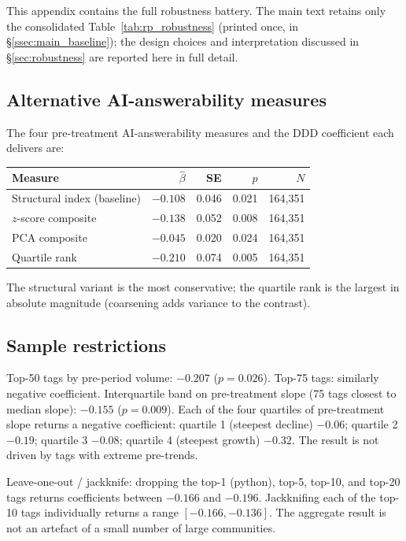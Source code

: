 This appendix contains the full robustness battery. The
main text retains only the consolidated
Table~\ref{tab:rp_robustness} (printed once, in
\S\ref{ssec:main_baseline}); the design choices and
interpretation discussed in
\S\ref{sec:robustness} are reported here in full detail.

\subsection{Alternative AI-answerability
measures}\label{app:rob_ai_measures}

The four pre-treatment AI-answerability measures and the
DDD coefficient each delivers are:

\begin{center}
\small
\begin{tabular}{lrrrr}
\toprule
Measure & $\hat\beta$ & SE & $p$ & $N$ \\
\midrule
Structural index (baseline) & $-0.108$ & 0.046 & 0.021 &
164{,}351 \\
$z$-score composite          & $-0.138$ & 0.052 & 0.008 &
164{,}351 \\
PCA composite                & $-0.045$ & 0.020 & 0.024 &
164{,}351 \\
Quartile rank                & $-0.210$ & 0.074 & 0.005 &
164{,}351 \\
\bottomrule
\end{tabular}
\end{center}

The structural variant is the most conservative; the
quartile rank is the largest in absolute magnitude
(coarsening adds variance to the contrast).

\subsection{Sample restrictions}\label{app:rob_samples}

Top-50 tags by pre-period volume: $-0.207$ ($p=0.026$).
Top-75 tags: similarly negative coefficient. Interquartile
band on pre-treatment slope (75 tags closest to median
slope): $-0.155$ ($p=0.009$). Each of the four quartiles of
pre-treatment slope returns a negative coefficient:
quartile 1 (steepest decline) $-0.06$;
quartile 2 $-0.19$;
quartile 3 $-0.08$;
quartile 4 (steepest growth) $-0.32$. The result is not
driven by tags with extreme pre-trends.

Leave-one-out / jackknife: dropping the top-1 (python),
top-5, top-10, and top-20 tags returns coefficients
between $-0.166$ and $-0.196$. Jackknifing each of the
top-10 tags individually returns a range
$[-0.166, -0.136]$. The aggregate result is not an
artefact of a small number of large communities.

